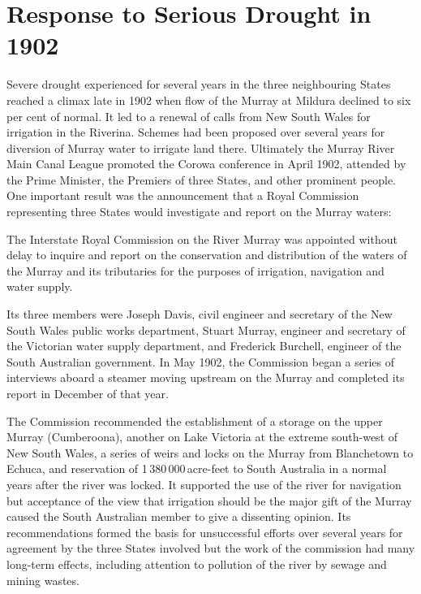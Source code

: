 \section*{Response to Serious Drought in 1902}

Severe drought experienced for several years in the three neighbouring
States reached a climax late in 1902 when flow of the Murray
 at Mildura declined to six per cent of normal. It
led to a renewal of calls from New South Wales for irrigation in the
Riverina.  Schemes had been proposed over several years for diversion
of Murray water to irrigate land there.  Ultimately the Murray River
Main Canal League promoted the Corowa conference in April 1902,
attended by the Prime Minister, the Premiers of three States, and
other prominent people.  One important result was the announcement
that a Royal Commission representing three States would investigate
and report on the Murray waters:
\begin{Quote}
	The Interstate Royal Commission on the River Murray
	 was
	appointed without delay to inquire and report on the
	conservation and distribution of the waters of the Murray and
	its tributaries for the purposes of irrigation, navigation and
	water supply.
\end{Quote}

Its three members were Joseph Davis,  civil engineer
and secretary of the New South Wales public works department, Stuart
Murray,  engineer and secretary of the Victorian
water supply department, and Frederick Burchell, 
engineer of the South Australian government.  In May 1902, the
Commission began a series of interviews aboard a steamer moving
upstream on the Murray and completed its report in December of that
year.

The Commission recommended the establishment of a storage on the upper
Murray (Cu\-m\-ber\-oona), another on Lake Victoria
 at the extreme south-west of New South Wales, a
series of weirs  and
locks on the Murray  from
Blanche\-town to Echuca, 
and reservation of 1\,380\,000\,acre-feet to South Australia in a
normal years after the river was locked. It supported the use of the
river for navigation but acceptance of the view that irrigation should
be the major gift of the Murray caused the South Australian member to
give a dissenting opinion.  Its recommendations formed the basis for
unsuccessful efforts over several years for agreement by the three
States involved but the work of the commission had many long-term
effects, including attention to pollution of the river by sewage and
mining wastes.

